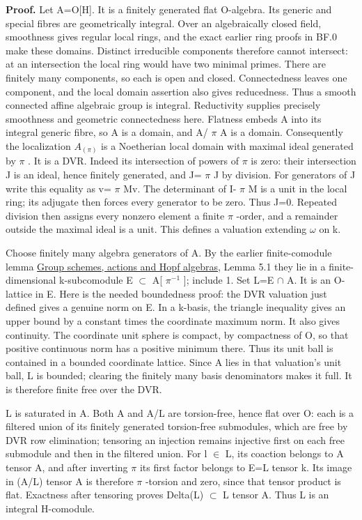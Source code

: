 \documentclass[
  11pt,
]{article}
\begin{document}
\textbf{Proof.} Let A=O{[}H{]}. It is a finitely generated flat
O-algebra. Its generic and special fibres are geometrically integral.
Over an algebraically closed field, smoothness gives regular local
rings, and the exact earlier ring proofs in BF.0 make these domains.
Distinct irreducible components therefore cannot intersect: at an
intersection the local ring would have two minimal primes. There are
finitely many components, so each is open and closed. Connectedness
leaves one component, and the local domain assertion also gives
reducedness. Thus a smooth connected affine algebraic group is integral.
Reductivity supplies precisely smoothness and geometric connectedness
here. Flatness embeds A into its integral generic fibre, so A is a
domain, and A/ \(\pi\) A is a domain. Consequently the localization
\(A_{(\pi)}\) is a Noetherian local domain with maximal ideal generated
by \(\pi\) . It is a DVR. Indeed its intersection of powers of \(\pi\)
is zero: their intersection J is an ideal, hence finitely generated, and
J= \(\pi\) J by division. For generators of J write this equality as v=
\(\pi\) Mv. The determinant of I- \(\pi\) M is a unit in the local ring;
its adjugate then forces every generator to be zero. Thus J=0. Repeated
division then assigns every nonzero element a finite \(\pi\) -order, and
a remainder outside the maximal ideal is a unit. This defines a
valuation extending \(\omega\) on k.

Choose finitely many algebra generators of A. By the earlier
finite-comodule lemma \href{../AG-GS/AG-GS-01.html}{Group schemes,
actions and Hopf algebras}, Lemma 5.1 they lie in a finite-dimensional
k-subcomodule E \(\subset\) A{[} \(\pi^{-1}\) {]}; include 1. Set L=E
\(\cap\) A. It is an O-lattice in E. Here is the needed boundedness
proof: the DVR valuation just defined gives a genuine norm on E. In a
k-basis, the triangle inequality gives an upper bound by a constant
times the coordinate maximum norm. It also gives continuity. The
coordinate unit sphere is compact, by compactness of O, so that positive
continuous norm has a positive minimum there. Thus its unit ball is
contained in a bounded coordinate lattice. Since A lies in that
valuation's unit ball, L is bounded; clearing the finitely many basis
denominators makes it full. It is therefore finite free over the DVR.

L is saturated in A. Both A and A/L are torsion-free, hence flat over O:
each is a filtered union of its finitely generated torsion-free
submodules, which are free by DVR row elimination; tensoring an
injection remains injective first on each free submodule and then in the
filtered union. For l \(\in\) L, its coaction belongs to A tensor A, and
after inverting \(\pi\) its first factor belongs to E=L tensor k. Its
image in (A/L) tensor A is therefore \(\pi\) -torsion and zero, since
that tensor product is flat. Exactness after tensoring proves Delta(L)
\(\subset\) L tensor A. Thus L is an integral H-comodule.
\end{document}
